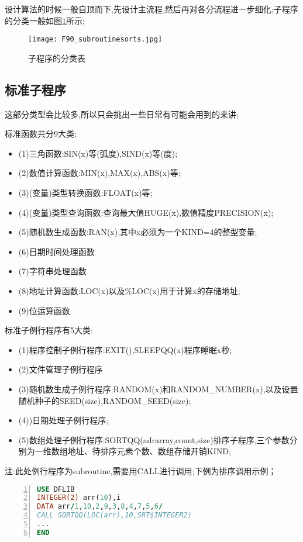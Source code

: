 设计算法的时候一般自顶而下,先设计主流程,然后再对各分流程进一步细化;子程序的分类一般如图\ref{F90-subroutinesorts}所示;
\begin{figure}[h]
	\noindent
	\centering
	\texttt{[image: F90\_subroutinesorts.jpg]}
	\caption{子程序的分类表}
	\label{F90-subroutinesorts}
\end{figure}

\subsection{标准子程序}
这部分类型会比较多,所以只会挑出一些日常有可能会用到的来讲;\par
标准函数共分9大类:
\begin{itemize}
	\item{(1)三角函数:SIN(x)等(弧度),SIND(x)等(度);}
	\item{(2)数值计算函数:MIN(x),MAX(x),ABS(x)等;}
	\item{(3)(变量)类型转换函数:FLOAT(x)等;}
	\item{(4)(变量)类型查询函数:查询最大值HUGE(x),数值精度PRECISION(x);}
	\item{(5)随机数生成函数:RAN(x),其中x必须为一个KIND=4的整型变量;}
	\item{(6)日期时间处理函数}
	\item{(7)字符串处理函数}
	\item{(8)地址计算函数:LOC(x)以及\%LOC(x)用于计算x的存储地址;}
	\item{(9)位运算函数}
\end{itemize}

标准子例行程序有5大类:
\begin{itemize}
	\item{(1)程序控制子例行程序:EXIT(),SLEEPQQ(x)程序睡眠x秒;}
	\item{(2)文件管理子例行程序}
	\item{(3)随机数生成子例行程序:RANDOM(x)和RANDOM\_NUMBER(x),以及设置随机种子的SEED(size),RANDOM\_SEED(size);}
	\item{(4))日期处理子例行程序;}
	\item{(5)数组处理子例行程序:SORTQQ(adrarray,count,size)排序子程序,三个参数分别为一维数组地址、待排序元素个数、数组存储开销KIND;}
\end{itemize}
注:此处例行程序为subroutine,需要用CALL进行调用;下例为排序调用示例；\par

\begin{lstlisting}[numbers=left,frame=single,language=Fortran]
USE DFLIB
INTEGER(2) arr(10),i
DATA arr/1,10,2,9,3,8,4,7,5,6/
CALL SORTQQ(LOC(arr),10,SRT$INTEGER2)
...
END
\end{lstlisting}
\par


